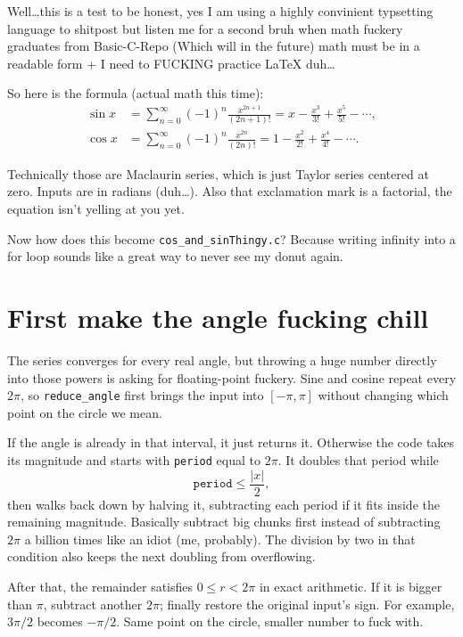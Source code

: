 \documentclass{article}
\begin{document}
Well\ldots this is a test to be honest, yes I am using a highly convinient typsetting language to shitpost but listen me for a
second bruh when math fuckery graduates from Basic-C-Repo (Which will in the future) math must be in a readable form + I need to FUCKING practice LaTeX duh\ldots


So here is the formula (actual math this time):
\begin{align*}
    \sin x &= \sum_{n=0}^{\infty}{(-1)}^n\frac{x^{2n+1}}{(2n+1)!}
            = x - \frac{x^3}{3!} + \frac{x^5}{5!} - \cdots, \\
    \cos x &= \sum_{n=0}^{\infty}{(-1)}^n\frac{x^{2n}}{(2n)!}
            = 1 - \frac{x^2}{2!} + \frac{x^4}{4!} - \cdots.
\end{align*}

Technically those are Maclaurin series, which is just Taylor series centered
at zero. Inputs are in radians (duh\ldots). Also that exclamation mark is a
factorial, the equation isn't yelling at you yet.

Now how does this become \texttt{cos\_and\_sinThingy.c}? Because writing
infinity into a for loop sounds like a great way to never see my donut again.

\section*{First make the angle fucking chill}

The series converges for every real angle, but throwing a huge number directly
into those powers is asking for floating-point fuckery. Sine and cosine repeat
every $2\pi$, so \texttt{reduce\_angle} first brings the input into
$[-\pi,\pi]$ without changing which point on the circle we mean.

If the angle is already in that interval, it just returns it. Otherwise the
code takes its magnitude and starts with \texttt{period} equal to $2\pi$.
It doubles that period while
\[
    \texttt{period} \leq \frac{|x|}{2},
\]
then walks back down by halving it, subtracting each period if it fits inside
the remaining magnitude. Basically subtract big chunks first instead of
subtracting $2\pi$ a billion times like an idiot (me, probably). The division
by two in that condition also keeps the next doubling from overflowing.

After that, the remainder satisfies $0 \leq r < 2\pi$ in exact arithmetic. If it is bigger
than $\pi$, subtract another $2\pi$; finally restore the original input's sign.
For example, $3\pi/2$ becomes $-\pi/2$. Same point on the circle, smaller
number to fuck with.
\end{document}
